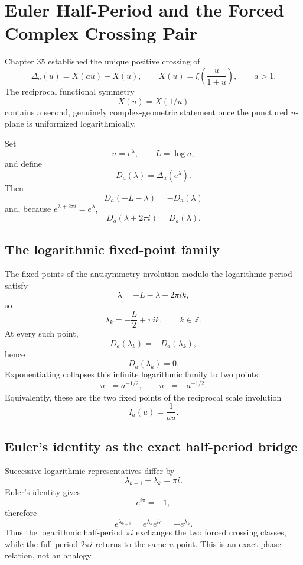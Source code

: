 \chapter{Euler Half-Period and the Forced Complex Crossing Pair}
\label{chap:euler-half-period-crossings}


Chapter 35 established the unique positive crossing of
\[
\Delta_a(u)=X(au)-X(u),\qquad
X(u)=\xi\!\left(\frac{u}{1+u}\right),\qquad a>1.
\]
The reciprocal functional symmetry
\[
X(u)=X(1/u)
\]
contains a second, genuinely complex-geometric statement once the punctured \(u\)-plane is uniformized logarithmically.

Set
\[
u=e^\lambda,\qquad L=\log a,
\]
and define
\[
D_a(\lambda)=\Delta_a(e^\lambda).
\]
Then
\[
\boxed{D_a(-L-\lambda)=-D_a(\lambda)}
\]
and, because \(e^{\lambda+2\pi i}=e^\lambda\),
\[
\boxed{D_a(\lambda+2\pi i)=D_a(\lambda)}.
\]

\section{The logarithmic fixed-point family}

The fixed points of the antisymmetry involution modulo the logarithmic period satisfy
\[
\lambda=-L-\lambda+2\pi i k,
\]
so
\[
\boxed{\lambda_k=-\frac{L}{2}+\pi i k},\qquad k\in\mathbb Z.
\]
At every such point,
\[
D_a(\lambda_k)=-D_a(\lambda_k),
\]
hence
\[
\boxed{D_a(\lambda_k)=0}.
\]
Exponentiating collapses this infinite logarithmic family to two points:
\[
\boxed{u_+=a^{-1/2}},\qquad
\boxed{u_-=-a^{-1/2}}.
\]
Equivalently, these are the two fixed points of the reciprocal scale involution
\[
I_a(u)=\frac{1}{au}.
\]

\section{Euler's identity as the exact half-period bridge}

Successive logarithmic representatives differ by
\[
\lambda_{k+1}-\lambda_k=\pi i.
\]
Euler's identity gives
\[
\boxed{e^{i\pi}=-1},
\]
therefore
\[
\boxed{e^{\lambda_{k+1}}
=e^{\lambda_k}e^{i\pi}
=-e^{\lambda_k}}.
\]
Thus the logarithmic half-period \(\pi i\) exchanges the two forced crossing classes, while the full period \(2\pi i\) returns to the same \(u\)-point. This is an exact phase relation, not an analogy.

